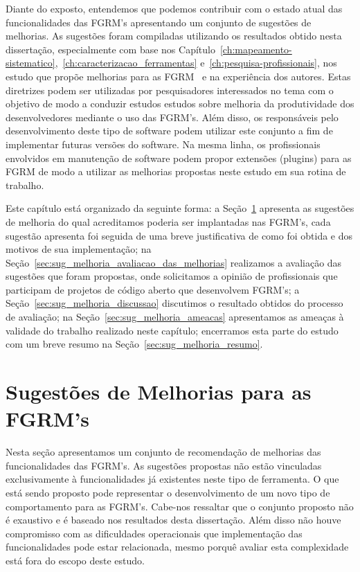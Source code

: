 Diante do exposto, entendemos que podemos contribuir com o estado atual das
funcionalidades das FGRM's apresentando um conjunto de sugestões de melhorias.
As sugestões foram compiladas utilizando os resultados obtido nesta dissertação,
especialmente com base nos
Capítulo~\ref{ch:mapeamento-sistematico},~\ref{ch:caracterizacao_ferramentas}
e~\ref{ch:pesquisa-profissionais}, nos estudo que propõe melhorias para as
FGRM~\cite{zimmermann2009improving, bettenburg2008makes, singh2011bug} e na
experiência dos autores. Estas diretrizes podem ser utilizadas por pesquisadores
interessados no tema com o objetivo de modo a conduzir estudos estudos sobre
melhoria da produtividade dos desenvolvedores mediante o uso das FGRM's. Além
disso, os responsáveis pelo desenvolvimento deste tipo de software podem
utilizar este conjunto a fim de implementar futuras versões do software. Na
mesma linha, os profissionais envolvidos em manutenção de software podem propor
extensões (plugins) para as FGRM de modo a utilizar as melhorias propostas neste
estudo em sua rotina de trabalho.

Este capítulo está organizado da seguinte forma: a
Seção~\ref{sec:sug_melhoria_melhorando_as_ferraementas} apresenta as sugestões
de melhoria do qual acreditamos poderia ser implantadas nas FGRM's, cada
sugestão apresenta foi seguida de uma breve justificativa de como foi obtida e
dos motivos de sua implementação; na
Seção~\ref{sec:sug_melhoria_avaliacao_das_melhorias} realizamos a avaliação das
sugestões que foram propostas, onde solicitamos a opinião de profissionais que
participam de projetos de código aberto que desenvolvem FGRM's; a
Seção~\ref{sec:sug_melhoria_discussao} discutimos o resultado obtidos do
processo de avaliação; na Seção~\ref{sec:sug_melhoria_ameacas} apresentamos as
ameaças à validade do trabalho realizado neste capítulo; encerramos esta parte
do estudo com um breve resumo na Seção~\ref{sec:sug_melhoria_resumo}.

\section{Sugestões de Melhorias para as FGRM's}
\label{sec:sug_melhoria_melhorando_as_ferraementas}

Nesta seção apresentamos um conjunto de recomendação de melhorias das
funcionalidades das FGRM's. As sugestões propostas não estão vinculadas
exclusivamente à funcionalidades já existentes neste tipo de ferramenta. O que
está sendo proposto pode representar o desenvolvimento de um novo tipo de
comportamento para as FGRM's. Cabe-nos ressaltar que o conjunto proposto não é
exaustivo e é baseado nos resultados desta dissertação. Além disso não houve
compromisso com as dificuldades operacionais que implementação das
funcionalidades pode estar relacionada, mesmo porquê avaliar esta complexidade
está fora do escopo deste estudo.


